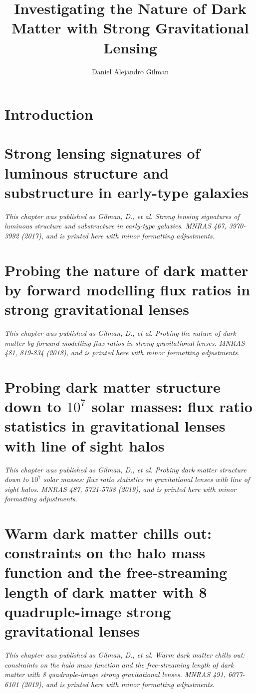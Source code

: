 \documentclass [PhD] {uclathes}
\title          {Investigating the Nature of Dark \\
                Matter with Strong Gravitational Lensing}
\author         {Daniel Alejandro Gilman}
\begin{document}
\makeintropages

%
%

\chapter{Introduction}

\chapter{Strong lensing signatures of luminous structure and substructure in early-type galaxies}
\textit{This chapter was published as Gilman, D., et al. Strong lensing signatures of luminous structure and substructure in early-type galaxies. MNRAS 467, 3970-3992 (2017), and is printed here with minor formatting adjustments.}

\chapter{Probing the nature of dark matter by forward modelling flux ratios in strong gravitational lenses}
\textit{This chapter was published as Gilman, D., et al. Probing the nature of dark matter by forward modelling flux ratios in strong gravitational lenses. MNRAS 481, 819-834 (2018), and is printed here with minor formatting adjustments.}

\chapter{Probing dark matter structure down to $10^7$ solar masses: flux ratio statistics in gravitational lenses with line of sight halos}
\textit{This chapter was published as Gilman, D., et al.  Probing dark matter structure down to $10^7$ solar masses: flux ratio statistics in gravitational lenses with line of sight halos. MNRAS 487, 5721-5738 (2019), and is printed here with minor formatting adjustments.}

\chapter{Warm dark matter chills out: constraints on the halo mass function and the free-streaming length of dark matter with 8 quadruple-image strong gravitational lenses}
\textit{This chapter was published as Gilman, D., et al. Warm dark matter chills out: constraints on the halo mass function and the free-streaming length of dark matter with 8 quadruple-image strong gravitational lenses. MNRAS 491, 6077-6101 (2019), and is printed here with minor formatting adjustments.}
\end{document}

